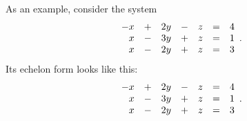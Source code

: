 As an example, consider the system
\begin{equation}
 \label{eq:two-parallel-one-not}
 \begin{array}{r c r c r c r}
  -x & + & 2y & - & z & = & 4\\
  x & - & 3y & + & z & = & 1\\
  x & - & 2y & + & z & = & 3
 \end{array}.
\end{equation}
Its echelon form looks like this:
\[
 \begin{array}{r c r c r c r}
  -x & + & 2y & - & z & = & 4\\
  x & - & 3y & + & z & = & 1\\
  x & - & 2y & + & z & = & 3
 \end{array}.
\]

